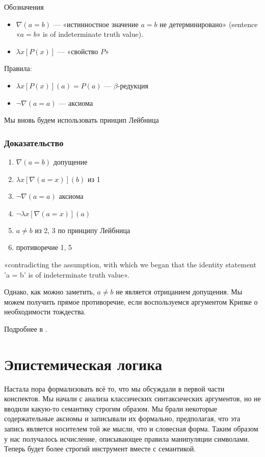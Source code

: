 \documentclass[openany]{book}
\theoremstyle{plain}
\theoremstyle{definition}
\begin{document}
Обозначения
\begin{itemize}
\item \(\nabla (a = b)\) — «истинностное значение \(a = b\) не детерминировано» (sentence «\(a = b\)» is of indeterminate truth value).
\item \(\lambda x [P(x)]\) — «свойство \(P\)»
\end{itemize}

Правила:
\begin{itemize}
\item \(\lambda x [P(x)](a) = P(a)\) — \(\beta\)-редукция
\item \(\neg \nabla (a = a)\) — аксиома
\end{itemize}

Мы вновь будем использовать принцип Лейбница

\subsection{ Доказательство }
\begin{enumerate}
\item \(\nabla (a = b)\) допущение
\item \(\lambda x [\nabla(a = x)](b)\) из 1
\item \(\neg \nabla(a = a)\) аксиома
\item \(\neg \lambda x [\nabla(a = x)](a)\)
\item \(a \not= b\) из 2, 3 по принципу Лейбница
\item противоречие 1, 5
\end{enumerate}
 
«contradicting the assumption, with which we began that the identity statement 'a = b' is of indeterminate truth value».

Однако, как можно заметить, \(a \not= b\) не является отрицанием допущения. Мы можем получить прямое противоречие, если воспользуемся аргументом Крипке о необходимости тождества.

Подробнее в \cite{Evans}.

\chapter{Эпистемическая логика}

Настала пора формализовать всё то, что мы обсуждали в первой части конспектов. Мы начали с анализа классических синтаксических аргументов, но не вводили какую-то семантику строгим образом. Мы брали некоторые содержательные аксиомы и записывали их формально, предполагая, что эта запись является носителем той же мысли, что и словесная форма. Таким образом у нас получалось исчисление, описывающее правила манипуляции символами. Теперь будет более строгий инструмент вместе с семантикой.
\end{document}
